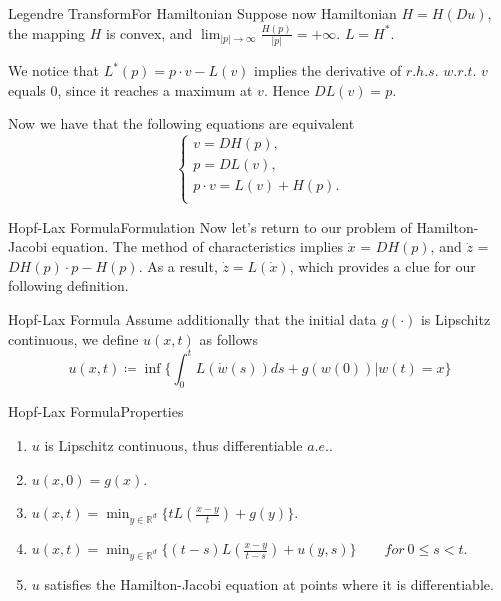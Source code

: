 \documentclass[english]{pkuslide}
\begin{document}
	\begin{frame}{Legendre Transform}{For Hamiltonian}
	Suppose now Hamiltonian $H=H(Du)$, the mapping $H$ is convex, and $\lim_{|p| \to \infty}\frac{H(p)}{|p|}=+\infty$. $L=H^*$.
	
	We notice that $L^{*}(p)= p\cdot v -L(v)$ implies the derivative of $r.h.s.$ $w.r.t.$ $v$ equals 0, since it reaches a maximum at $v$. Hence $DL(v)=p$. 
	
	Now we have that the following equations are equivalent
	\begin{equation}
  \left\{
   \begin{array}{l}
   v= DH(p), \\
   p= DL(v), \\
   p\cdot v = L(v)+ H(p).  \\
   \end{array}
  \right.
\end{equation}
	\end{frame}
	\begin{frame}{Hopf-Lax Formula}{Formulation}
	Now let's return to our problem of Hamilton-Jacobi equation. The method of characteristics implies $\dot x$ = $DH(p)$, and $\dot z$ = $DH(p) \cdot p -H(p)$. As a result, $\dot z=L(\dot x)$, which provides a clue for our following definition.
	\begin{exampleblock}{Hopf-Lax Formula}
Assume additionally that the initial data $g(\cdot)$ is Lipschitz continuous, we define $u(x,t)$ as follows
\begin{equation}
u(x,t) \coloneqq \inf \{\int_{0}^{t}L(\dot w(s))ds +g(w(0)) | w(t)=x \}
\end{equation}
\end{exampleblock}
	\end{frame}
	\begin{frame}{Hopf-Lax Formula}{Properties}
	\begin{enumerate}[<+->]
\item $u$ is Lipschitz continuous, thus differentiable $a.e.$.
\item \begin{math} u(x,0)=g(x)  \end{math}.
\item \begin{math} u(x,t) = \min_{y \in \mathbb{R}^{d}} \{ tL(\frac{x-y}{t})+g(y) \} \end{math}.
\item  \begin{math} u(x,t) = \min_{y \in \mathbb{R}^{d}} \{ (t-s)L(\frac{x-y}{t-s})+u(y,s) \} \qquad for \ 0 \leq s <t \end{math}.
\item $u$ satisfies the Hamilton-Jacobi equation at points where it is differentiable.
\end{enumerate}
	\end{frame}
\end{document}

